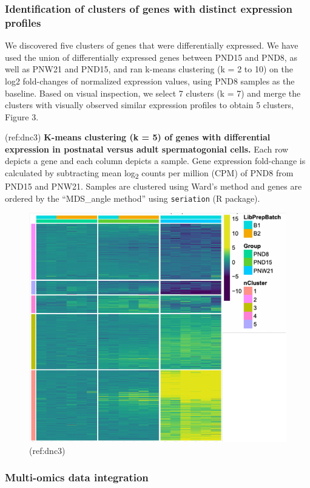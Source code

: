 \documentclass[12pt,twoside]{reedthesis}
\begin{document}
\hypertarget{identification-of-clusters-of-genes-with-distinct-expression-profiles}{%
\subsubsection{Identification of clusters of genes with distinct expression profiles}\label{identification-of-clusters-of-genes-with-distinct-expression-profiles}}

We discovered five clusters of genes that were differentially expressed.
We have used the union of differentially expressed genes between PND15
and PND8, as well as PNW21 and PND15, and ran k-means clustering (k = 2
to 10) on the log2 fold-changes of normalized expression values, using
PND8 samples as the baseline. Based on visual inspection, we select 7
clusters (k = 7) and merge the clusters with visually observed similar
expression profiles to obtain 5 clusters, Figure 3.

(ref:dnc3)
\textbf{K-means clustering (k = 5) of genes with differential expression in postnatal versus adult spermatogonial cells.}
Each row depicts a gene and each column depicts a sample. Gene
expression fold-change is calculated by subtracting mean
log\textsubscript{2} counts per million (CPM) of PND8 from PND15 and
PNW21. Samples are clustered using Ward's method and genes are ordered
by the ``MDS\_angle method'' using \texttt{seriation} (R package).
\begin{figure}[h]

{\centering \includegraphics{thesis_files/figure-latex/dn3-1} 

}

\caption[K-means clustering of differentiallly expressed genes]{(ref:dnc3)}\label{fig:dn3}
\end{figure}
\hypertarget{multi-omics-data-integration-1}{%
\subsubsection{Multi-omics data integration}\label{multi-omics-data-integration-1}}
\end{document}
